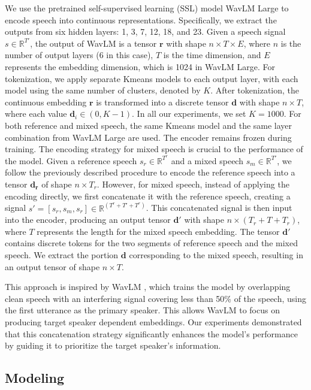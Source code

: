 \documentclass[conference]{IEEEtran}
\begin{document}
We use the pretrained self-supervised learning (SSL) model WavLM Large \cite{wavlm} to encode speech into continuous representations. Specifically, we extract the outputs from six hidden layers: 1, 3, 7, 12, 18, and 23. Given a speech signal \(s \in \mathbb{R}^{T'}\), the output of WavLM is a tensor \(\bm{r}\) with shape \(n \times T \times E\), where \(n\) is the number of output layers (6 in this case), \(T\) is the time dimension, and \(E\) represents the embedding dimension, which is 1024 in WavLM Large.  For tokenization, we apply separate Kmeans models to each output layer, with each model using the same number of clusters, denoted by \(K\). After tokenization, the continuous embedding \(\bm{r}\) is transformed into a discrete tensor \(\bm{d}\) with shape \(n \times T\), where each value \(\bm{d}_{i} \in (0, K-1) \). In all our experiments, we set \(K = 1000\). For both reference and mixed speech, the same Kmeans model and the same layer combination from WavLM Large are used. The encoder remains frozen during training.
The encoding strategy for mixed speech is crucial to the performance of the model. Given a reference speech \(s_r \in \mathbb{R}^{T^r}\) and a mixed speech \(s_m \in \mathbb{R}^{T'}\), we follow the previously described procedure to encode the reference speech into a tensor \(\bm{d_r}\) of shape \(n \times T_r\). However, for mixed speech, instead of applying the encoding directly, we first concatenate it with the reference speech, creating a signal \(s' = [s_r, s_m, s_r] \in \mathbb{R}^{(T^r + T' + T^r)}\). This concatenated signal is then input into the encoder, producing an output tensor \(\bm{d'}\) with shape \(n \times (T_r + T + T_r)\), where \(T\) represents the length for the mixed speech embedding. The tensor \(\bm{d'}\) contains discrete tokens for the two segments of reference speech and the mixed speech. We extract the portion \(\bm{d}\) corresponding to the mixed speech, resulting in an output tensor of shape \(n \times T\).

This approach is inspired by WavLM \cite{wavlm}, which trains the model by overlapping clean speech with an interfering signal covering less than 50\% of the speech, using the first utterance as the primary speaker. This allows WavLM to focus on producing target speaker dependent embeddings. Our experiments demonstrated that this concatenation strategy significantly enhances the model's performance by guiding it to prioritize the target speaker's information.
\subsection{Modeling}
\end{document}
